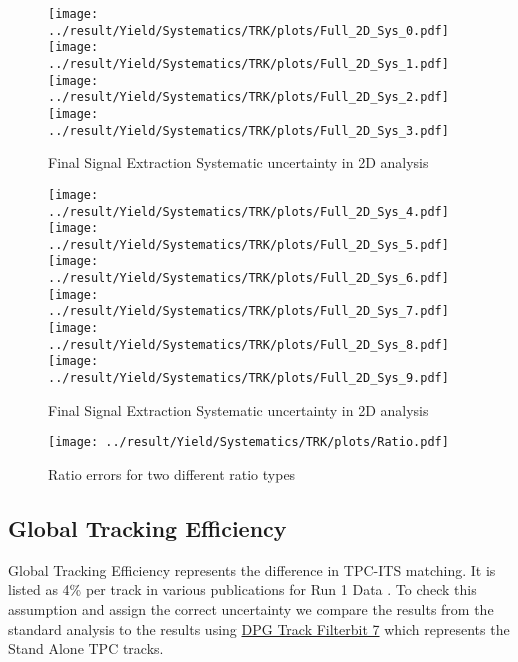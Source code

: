 \begin{figure}
	\centering
		\texttt{[image: ../result/Yield/Systematics/TRK/plots/Full\_2D\_Sys\_0.pdf]}
		\texttt{[image: ../result/Yield/Systematics/TRK/plots/Full\_2D\_Sys\_1.pdf]}\\
		\texttt{[image: ../result/Yield/Systematics/TRK/plots/Full\_2D\_Sys\_2.pdf]}
		\texttt{[image: ../result/Yield/Systematics/TRK/plots/Full\_2D\_Sys\_3.pdf]}
		\caption{Final Signal Extraction Systematic uncertainty in 2D analysis}
		\label{}
\end{figure}

\newpage
\begin{figure}
	\centering
		\texttt{[image: ../result/Yield/Systematics/TRK/plots/Full\_2D\_Sys\_4.pdf]}
		\texttt{[image: ../result/Yield/Systematics/TRK/plots/Full\_2D\_Sys\_5.pdf]}\\
		\texttt{[image: ../result/Yield/Systematics/TRK/plots/Full\_2D\_Sys\_6.pdf]}
		\texttt{[image: ../result/Yield/Systematics/TRK/plots/Full\_2D\_Sys\_7.pdf]}\\
		\texttt{[image: ../result/Yield/Systematics/TRK/plots/Full\_2D\_Sys\_8.pdf]}
		\texttt{[image: ../result/Yield/Systematics/TRK/plots/Full\_2D\_Sys\_9.pdf]}
		\caption{Final Signal Extraction Systematic uncertainty in 2D analysis}
		\label{}
\end{figure}

\newpage
\begin{figure}
	\centering
		\texttt{[image: ../result/Yield/Systematics/TRK/plots/Ratio.pdf]}
		\caption{Ratio errors for two different ratio types}
		\label{}
\end{figure}

\subsection{Global Tracking Efficiency}
Global Tracking Efficiency represents the difference in TPC-ITS matching. It is listed as 4\% per track in various publications for Run 1 Data \cite{PrevPubMult}. To check this assumption and assign the correct uncertainty we compare the results from the standard analysis to the results using \href{https://twiki.cern.ch/twiki/bin/viewauth/ALICE/AliDPGtoolsFilteringCuts#Run_flag_1000_AddTrackCutsLHC10b}{DPG Track Filterbit 7} which represents the Stand Alone TPC tracks.

